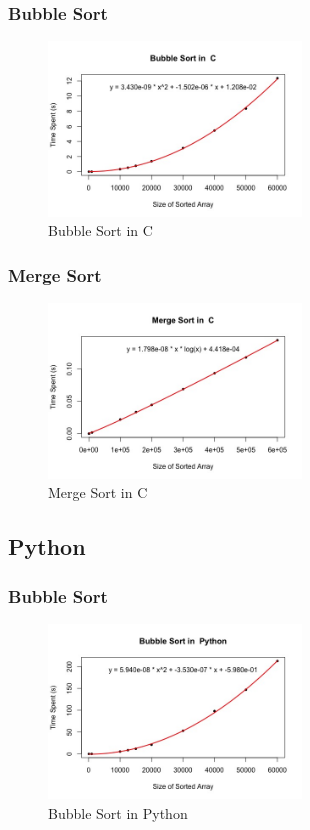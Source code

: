 \documentclass[]{report}
\begin{document}
		 		\subsubsection{Bubble Sort}
					\begin{figure}[H]
						\centering
						\includegraphics[width=0.6\textwidth]{resources/visualizations/bubblesortc.jpeg}
						\caption{Bubble Sort in C}
					\end{figure}
					
		 		\subsubsection{Merge Sort}
					\begin{figure}[H]
						\centering
						\includegraphics[width=0.6\textwidth]{resources/visualizations/mergesortc.jpeg}
						\caption{Merge Sort in C}
					\end{figure}
					
		 	\subsection{Python}
		 	
		 		\subsubsection{Bubble Sort}
					\begin{figure}[H]
						\centering
						\includegraphics[width=0.6\textwidth]{resources/visualizations/bubblesortpython.jpeg}
						\caption{Bubble Sort in Python}
					\end{figure}
					
\end{document}
